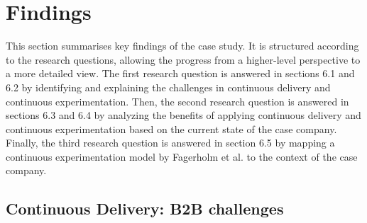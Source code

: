 \documentclass[english, grading]{tktltiki2}
\theoremstyle{definition}
\theoremstyle{remark}
\begin{document}
\section{Findings}
This section summarises key findings of the case study. It is structured according to the research questions, allowing the progress from a higher-level perspective to a more detailed view. The first research question is answered in sections 6.1 and 6.2 by identifying and explaining the challenges in continuous delivery and continuous experimentation. Then, the second research question is answered in sections 6.3 and 6.4 by analyzing the benefits of applying continuous delivery and continuous experimentation based on the current state of the case company. Finally, the third research question is answered in section 6.5 by mapping a continuous experimentation model by Fagerholm et al. \cite{fagerholm2014building} to the context of the case company.


%




\subsection{Continuous Delivery: B2B challenges}
\end{document}

